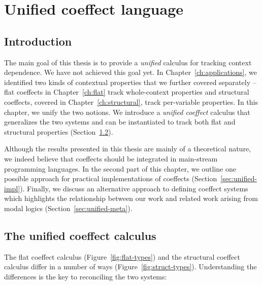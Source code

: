 
\chapter{Unified coeffect language} 
\label{ch:unified} 


\section{Introduction}

The main goal of this thesis is to provide a \emph{unified} calculus for tracking context 
dependence. We have not achieved this goal yet. In Chapter~\ref{ch:applications}, we identified 
two kinds of contextual properties that we further covered separately -- flat coeffects in 
Chapter~\ref{ch:flat} track whole-context properties and structural coeffects, covered in 
Chapter~\ref{ch:structural}, track per-variable properties. In this chapter, we unify
the two notions. We introduce a \emph{unified coeffect} calculus that generalizes the two systems
and can be instantiated to track both flat and structural properties (Section~\ref{sec:unified-unified}). 

Although the results presented in this thesis are mainly of a theoretical nature, we indeed 
believe that coeffects should be integrated in main-stream programming languages. In the second
part of this chapter, we outline one possible approach for practical implementations of coeffects 
(Section~\ref{sec:unified-impl}). Finally, we discuss an alternative approach to defining coeffect 
systems which highlights the relationship between our work and related work arising from modal logics 
(Section~\ref{sec:unified-meta}). 


\section{The unified coeffect calculus}
\label{sec:unified-unified}

The flat coeffect calculus (Figure~\ref{fig:flat-types}) and the structural coeffect calculus 
differ in a number of ways (Figure~\ref{fig:struct-types}). Understanding the differences is the 
key to reconciling the two systems:

